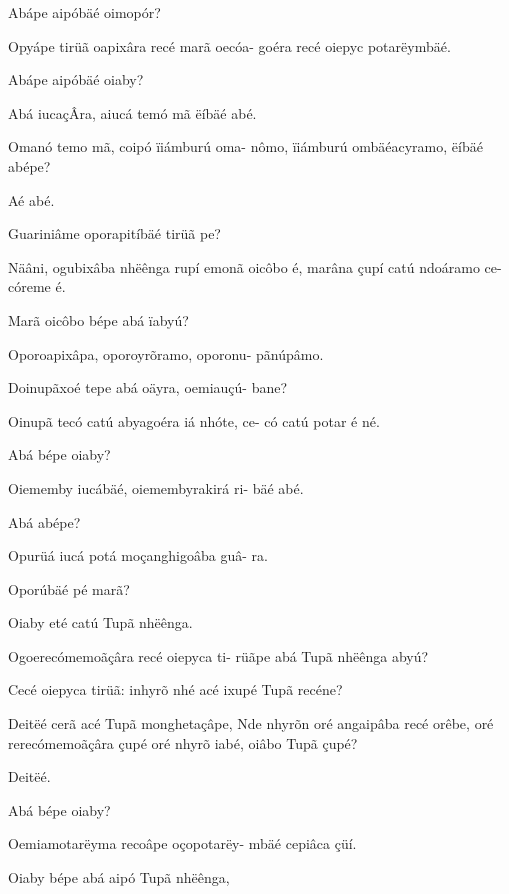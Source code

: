 \documentclass[openany,titlepage,12pt]{book}
\begin{document}
\begin{alternate}
    \item Abápe aipóbäé oimopór?
    \item Opyápe tirüã oapixâra recé marã oecóa-
        goéra recé oiepyc potarëymbäé.
    \item Abápe aipóbäé oiaby?
    \item Abá iucaçÂra, aiucá temó mã ëíbäé abé.
    \item Omanó temo mã, coipó ïiámburú oma-
        nômo, ïiámburú ombäéacyramo, ëíbäé
        abépe?
    \item Aé abé.
    \item Guariniâme oporapitíbäé tirüã pe?
    \item Näâni, ogubixâba nhëênga rupí emonã
        oicôbo é, marâna çupí catú ndoáramo ce-
        córeme é.
    \item Marã oicôbo bépe abá ïabyú?
    \item Oporoapixâpa, oporoyrõramo, oporonu-
        pãnúpâmo.
    \item Doinupãxoé tepe abá oäyra, oemiauçú-
        bane?
    \item Oinupã tecó catú abyagoéra iá nhóte, ce-
        có catú potar é né.
    \item Abá bépe oiaby?
    \item Oiememby iucábäé, oiemembyrakirá ri-
        bäé abé.
    \item Abá abépe?
    \item Opurüá iucá potá moçanghigoâba guâ-
        ra.
    \item Oporúbäé pé marã?
    \item Oiaby eté catú Tupã nhëênga.
    \item Ogoerecómemoãçâra recé oiepyca ti-\linebreak
        rüãpe abá Tupã nhëênga abyú?
    \item Cecé oiepyca tirüã: inhyrõ nhé acé ixupé
        Tupã recéne?
    \item Deitëé cerã acé Tupã monghetaçâpe,\linebreak
        Nde nhyrõn oré angaipâba recé orêbe, oré
        rerecómemoãçâra çupé oré nhyrõ iabé,\linebreak
        oiâbo Tupã çupé?
    \item Deitëé.
    \item Abá bépe oiaby?
    \item Oemiamotarëyma recoâpe oçopotarëy-
        mbäé cepiâca çüí.
    \item Oiaby bépe abá aipó Tupã nhëênga,\linebreak

\end{alternate}
\end{document}
